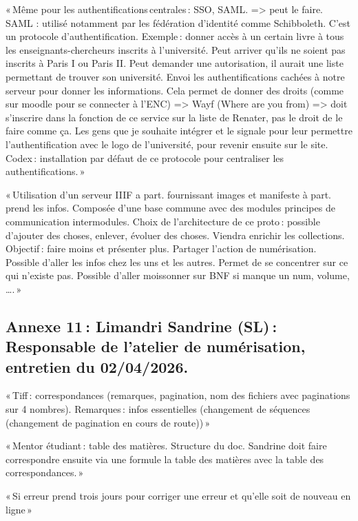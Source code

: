 « Même pour les authentifications centrales : SSO, SAML. => peut le faire. SAML : utilisé notamment par les fédération d'identité comme Schibboleth. C’est un protocole d’authentification. Exemple : donner accès à un certain livre à tous les enseignants-chercheurs inscrits à l’université. Peut arriver qu’ils ne soient pas inscrits à Paris I ou Paris II. Peut demander une autorisation, il aurait une liste permettant de trouver son université. Envoi les authentifications cachées à notre serveur pour donner les informations. Cela permet de donner des droits (comme sur moodle pour se connecter à l’ENC) => Wayf (Where are you from) => doit s’inscrire dans la fonction de ce service sur la liste de Renater, pas le droit de le faire comme ça. Les gens que je souhaite intégrer et le signale pour leur permettre l’authentification avec le logo de l’université, pour revenir ensuite sur le site. Codex : installation par défaut de ce protocole pour centraliser les authentifications. »  

« Utilisation d’un serveur IIIF a part. fournissant images et manifeste à part. prend les infos. Composée d’une base commune avec des modules principes de communication intermodules. Choix de l’architecture de ce proto : possible d’ajouter des choses, enlever, évoluer des choses. Viendra enrichir les collections. Objectif : faire moins et présenter plus. Partager l’action de numérisation. Possible d’aller les infos chez les uns et les autres. Permet de se concentrer sur ce qui n’existe pas. Possible d’aller moissonner sur BNF si manque un num, volume, …. » 

\subsection*{Annexe 11 : Limandri Sandrine (SL) : Responsable de l’atelier de numérisation, entretien du 02/04/2026.} 

« Tiff : correspondances (remarques, pagination, nom des fichiers avec paginations sur 4 nombres). Remarques : infos essentielles (changement de séquences (changement de pagination en cours de route)) » 

« Mentor étudiant : table des matières. Structure du doc. Sandrine doit faire correspondre ensuite via une formule la table des matières avec la table des correspondances. » 

« Si erreur prend trois jours pour corriger une erreur et qu’elle soit de nouveau en ligne »  

